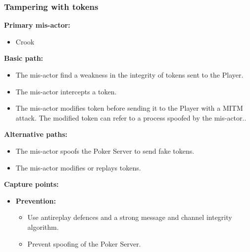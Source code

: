 \documentclass[a4paper,11pt]{report}
\begin{document}
\subsubsection{Tampering with tokens}
\label{PlayerFlowCasesT2}
\textbf{Primary mis-actor:}
\begin{itemize}
\item Crook
\end{itemize}
\textbf{Basic path:}
\begin{itemize}
\item The mis-actor find a weakness in the integrity of tokens sent to the Player.
\item The mis-actor intercepts a token.
\item The mis-actor modifies token before sending it to the Player with a MITM attack. The modified token can refer to a process spoofed by the mis-actor..
\end{itemize}
\textbf{Alternative paths:}
\begin{itemize}
\item The mis-actor spoofs the Poker Server to send fake tokens.
\item The mis-actor modifies or replays tokens.
\end{itemize}
\textbf{Capture points:}
\begin{itemize}
\item \textbf{Prevention:}
\begin{itemize}
\item Use antireplay defences and a strong message and channel integrity algorithm.
\item Prevent spoofing of the Poker Server.
\end{itemize}
\end{itemize}
\end{document}
